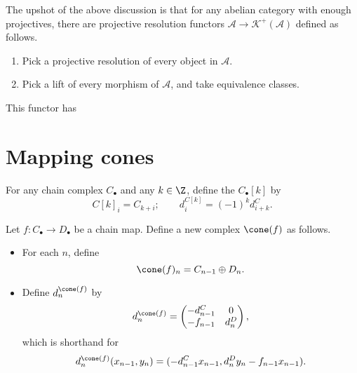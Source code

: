 \documentclass[main.tex]{subfiles}
\begin{document}
The upshot of the above discussion is that for any abelian category with enough projectives, there are projective resolution functors $\mathcal{A} \to \mathcal{K}^{+}(\mathcal{A})$ defined as follows.
\begin{enumerate}
  \item Pick a projective resolution of every object in $\mathcal{A}$.

  \item Pick a lift of every morphism of $\mathcal{A}$, and take equivalence classes.
\end{enumerate}

This functor has

\section{Mapping cones}
\label{sec:mapping_cones}

\begin{definition}
  \label{def:shift_functor}
  For any chain complex $C_{\bullet}$ and any $k \in \Z$, define the  $C_{\bullet}[k]$ by
  \begin{equation*}
    C[k]_{i} = C_{k+i};\qquad d^{C[k]}_{i} = (-1)^{k}d^{C}_{i+k}.
  \end{equation*}
\end{definition}

\begin{definition}
  \label{def:mapping_cone}
  Let $f\colon C_{\bullet} \to D_{\bullet}$ be a chain map. Define a new complex $\cone(f)$ as follows.
  \begin{itemize}
    \item For each $n$, define
      \begin{equation*}
        \cone(f)_{n} = C_{n-1} \oplus D_{n}.
      \end{equation*}

    \item Define $d^{\cone(f)}_{n}$ by
      \begin{equation*}
        d^{\cone(f)}_{n} =
        \begin{pmatrix}
          -d^{C}_{n-1} & 0 \\
          -f_{n-1} & d^{D}_{n}
        \end{pmatrix},
      \end{equation*}
      which is shorthand for
      \begin{equation*}
        d^{\cone(f)}_{n}(x_{n-1}, y_{n}) = (-d^{C}_{n-1}x_{n-1}, d^{D}_{n}y_{n} - f_{n-1}x_{n-1}).
      \end{equation*}
  \end{itemize}
\end{definition}
\end{document}
